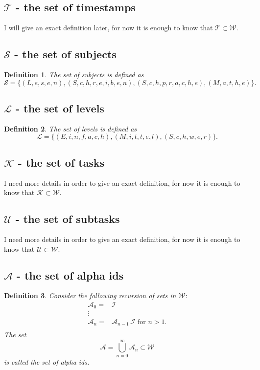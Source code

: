 \documentclass{scrartcl}
\newtheorem{mydef}{Definition}
\begin{document}
\subsection{$\mathcal{T}$ - the set of timestamps}
I will give an exact definition later, for now it is enough to know that $\mathcal{T}\subset\mathcal{W}$.
\subsection{$\mathcal{S}$ - the set of subjects}
\begin{mydef}
The \emph{set of subjects} is defined as
\begin{equation}
\mathcal{S}=\{(L,e,s,e,n),(S,c,h,r,e,i,b,e,n),(S,c,h,p,r,a,c,h,e),(M,a,t,h,e)\}.
\end{equation}
\end{mydef}

\subsection{$\mathcal{L}$ - the set of levels}
\begin{mydef}
The \emph{set of levels} is defined as
\begin{equation}
\mathcal{L}=\{(E,i,n,f,a,c,h),(M,i,t,t,e,l),(S,c,h,w,e,r)\}.
\end{equation}
\end{mydef}

\subsection{$\mathcal{K}$ - the set of tasks}
I need more details in order to give an exact definition, for now it is enough to know that $\mathcal{K}\subset\mathcal{W}$.

\subsection{$\mathcal{U}$ - the set of subtasks}
I need more details in order to give an exact definition, for now it is enough to know that $\mathcal{U}\subset\mathcal{W}$.

\subsection{$\mathcal{A}$ - the set of alpha ids}
\begin{mydef}
Consider the following recursion of sets in $\mathcal{W}:$
\begin{equation}
\begin{split}
\mathcal{A}_0= & \mathcal{I}\\
\vdots &\\
\mathcal{A}_{n} = &\mathcal{A}_{n-1}.\mathcal{I} \mbox{ for } n>1.\\
\end{split}
\end{equation}
The set $$\mathcal{A}=\bigcup_{n=0}^{\infty}\mathcal{A}_n\subset\mathcal{W}$$ is called the \emph{set of alpha ids}. 
\end{mydef}
\end{document}
